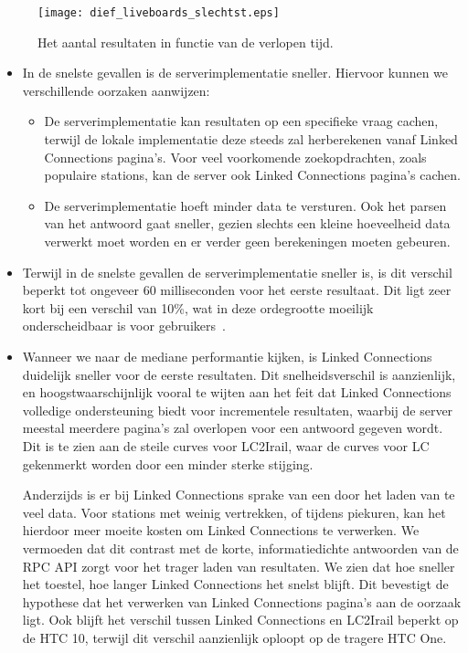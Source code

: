 \begin{figure}[h]
	\centering
	\texttt{[image: dief\_liveboards\_slechtst.eps]}
	\caption[Aantal resultaten liveboards in functie van de tijd]{Het aantal resultaten in functie van de verlopen tijd.}
	\label{fig:liveboardsDiefSlechtst}
\end{figure}


\begin{itemize}
    \item In de snelste gevallen is de serverimplementatie sneller. Hiervoor kunnen we verschillende oorzaken aanwijzen: 
	\begin{itemize}
		\item De serverimplementatie kan resultaten op een specifieke vraag cachen, terwijl de lokale implementatie deze steeds zal herberekenen vanaf Linked Connections pagina's. Voor veel voorkomende zoekopdrachten, zoals populaire stations, kan de server ook Linked Connections pagina's cachen.
		\item De serverimplementatie hoeft minder data te versturen. Ook het parsen van het antwoord gaat sneller, gezien slechts een kleine hoeveelheid data verwerkt moet worden en er verder geen berekeningen moeten gebeuren.
	\end{itemize}

	\item Terwijl in de snelste gevallen de serverimplementatie sneller is, is dit verschil beperkt tot ongeveer 60 milliseconden voor het eerste resultaat. Dit ligt zeer kort bij een verschil van 10\%, wat in deze ordegrootte moeilijk onderscheidbaar is voor gebruikers~\citep{miller68}. %
	
	\item Wanneer we naar de mediane performantie kijken, is Linked Connections duidelijk sneller voor de eerste resultaten. Dit snelheidsverschil is aanzienlijk, en hoogstwaarschijnlijk vooral te wijten aan het feit dat Linked Connections volledige ondersteuning biedt voor incrementele resultaten, waarbij de server meestal meerdere pagina's zal overlopen voor een  antwoord gegeven wordt. Dit is te zien aan de steile curves voor LC2Irail, waar de curves voor LC gekenmerkt worden door een minder sterke stijging. 
	
	Anderzijds is er bij Linked Connections sprake van een  door het laden van te veel data. Voor stations met weinig vertrekken, of tijdens piekuren, kan het hierdoor meer moeite kosten om Linked Connections te verwerken. We vermoeden dat dit contrast met de korte, informatiedichte antwoorden van de RPC API zorgt voor het trager laden van resultaten. We zien dat hoe sneller het toestel, hoe langer Linked Connections het snelst blijft. Dit bevestigt de hypothese dat het verwerken van Linked Connections pagina's aan de oorzaak ligt. Ook blijft het verschil tussen Linked Connections en LC2Irail beperkt op de HTC 10, terwijl dit verschil aanzienlijk oploopt op de tragere HTC One.
	

\end{itemize}
